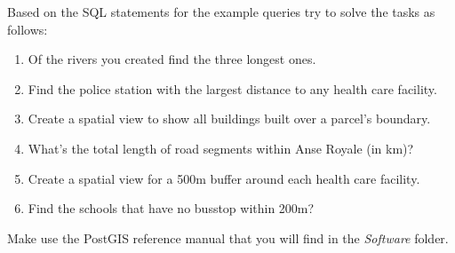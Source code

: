 \documentclass[a4paper,12pt,titlepage]{article}
\begin{document}
Based on the SQL statements for the example queries try to solve the tasks as follows:

\begin{enumerate}
	\item Of the rivers you created find the three longest ones.
	\item Find the police station with the largest distance to any health care facility.
	\item Create a spatial view to show all buildings built over a parcel's boundary.
	\item What's the total length of road segments within Anse Royale (in km)?
	\item Create a spatial view for a 500m buffer around each health care facility.
	\item Find the schools that have no busstop within 200m?
\end{enumerate}

Make use the PostGIS reference manual that you will find in the \textit{Software} folder.
\end{document}
